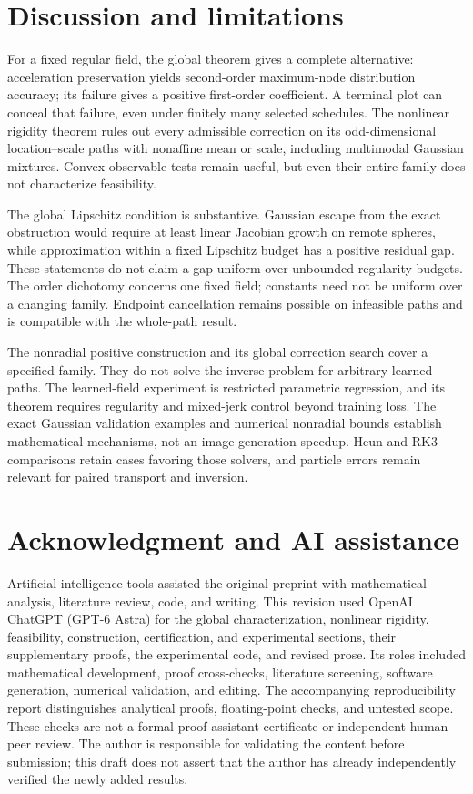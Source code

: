 \documentclass[journal,10pt,romanappendices]{IEEEtran}
\theoremstyle{definition}
\begin{document}
\section{Discussion and limitations}

For a fixed regular field, the global theorem gives a complete alternative:
acceleration preservation yields second-order maximum-node distribution
accuracy; its failure gives a positive first-order coefficient. A terminal
plot can conceal that failure, even under finitely many selected schedules.
The nonlinear rigidity theorem rules out every admissible correction on its
odd-dimensional location--scale paths with nonaffine mean or scale,
including multimodal Gaussian mixtures.
Convex-observable tests remain useful, but even their entire family does not
characterize feasibility.

The global Lipschitz condition is substantive. Gaussian escape from the
exact obstruction would require at least linear Jacobian growth on remote
spheres, while approximation within a fixed Lipschitz budget has a positive
residual gap. These statements do not claim a gap uniform over unbounded
regularity budgets. The order dichotomy concerns one fixed field; constants
need not be uniform over a changing family. Endpoint cancellation remains
possible on infeasible paths and is compatible with the whole-path result.

The nonradial positive construction and its global correction search cover
a specified family. They do not solve the inverse problem for arbitrary
learned paths. The learned-field experiment is restricted parametric
regression, and its theorem requires regularity and mixed-jerk control
beyond training loss. The exact Gaussian validation examples and numerical
nonradial bounds establish mathematical mechanisms, not an image-generation
speedup. Heun and RK3 comparisons retain cases favoring those solvers, and
particle errors remain relevant for paired transport and inversion.

\section*{Acknowledgment and AI assistance}
Artificial intelligence tools assisted the original preprint with mathematical analysis, literature review, code, and writing. This revision used OpenAI ChatGPT (GPT-6 Astra) for the global characterization, nonlinear rigidity, feasibility, construction,
certification, and experimental sections, their supplementary proofs, the
experimental code, and revised prose. Its roles included mathematical development, proof cross-checks, literature screening, software generation, numerical validation, and editing. The accompanying reproducibility report distinguishes analytical proofs, floating-point checks, and untested scope. These checks are not a formal proof-assistant certificate or independent human peer review. The author is responsible for validating the content before submission; this draft does not assert that the author has already independently verified the newly added results.
\end{document}
